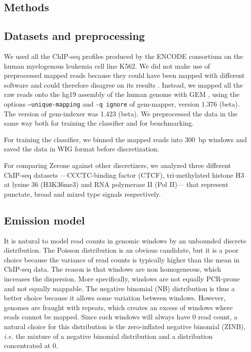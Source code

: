 \documentclass{bioinfo}
\begin{document}
\begin{methods}
\section{Methods}

\subsection{Datasets and preprocessing}
We used all the ChIP-seq profiles produced by the ENCODE consortium on the human
myelogenous leukemia cell line K562. We did not make use of preprocessed mapped
reads because they could have been mapped with different software and could
therefore disagree on its results \citep{Szalkowski2011}. Instead, we mapped all
the raw reads onto the hg19 assembly of the human genome with GEM
\citep{Marco-Sola2012}, using the options \texttt{--unique-mapping} and
\texttt{-q ignore} of gem-mapper, version 1.376 (beta). The version of
gem-indexer was 1.423 (beta). We preprocessed the data in the same
way both for training the classifier and for benchmarking.

For training the classifier, we binned the mapped reads into 300~bp windows and
saved the data in WIG format before discretization.

For comparing Zerone against other discretizers, we analyzed three different
ChIP-seq datasets ---CCCTC-binding factor (CTCF), tri-methylated histone H3 at
lysine 36 (H3K36me3) and RNA polymerase II (Pol II)--- that represent punctate,
broad and mixed type signals respectively.

\subsection{Emission model}
It is natural to model read counts in genomic windows by an unbounded
discrete distribution. The Poisson distribution is an obvious candidate,
but it is a poor choice because the variance of read counts is typically
higher than the mean in ChIP-seq data. The reason is that windows are non
homogeneous, which increases the dispersion. More specifically, windows
are not equally PCR-prone and not equally mappable. The negative binomial
(NB) distribution is thus a better choice because it allows some variation
between windows. However, genomes are fraught with repeats, which creates
an excess of windows where reads cannot be mapped.  Since such windows
will always have 0 read count, a natural choice for this distribution is
the zero-inflated negative binomial (ZINB), \textit{i.e.} the mixture of
a negative binomial distribution and a distribution concentrated at 0.


\end{methods}
\end{document}
